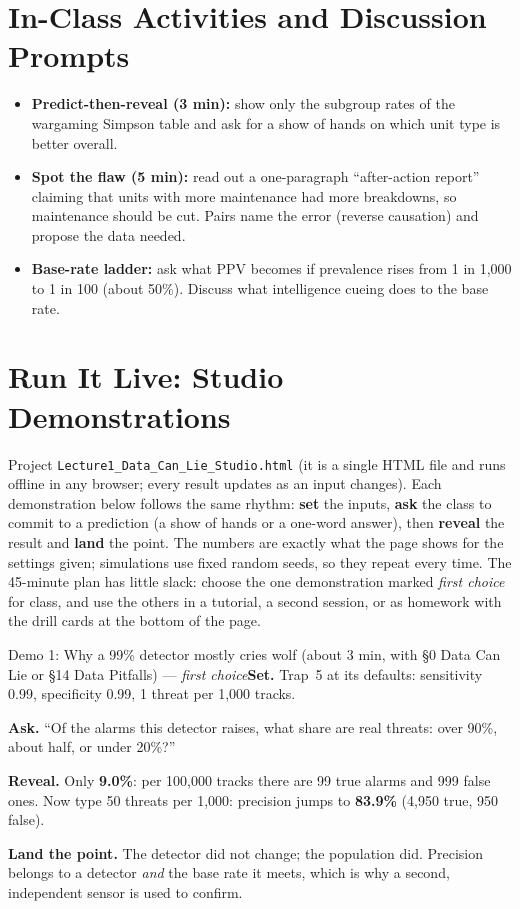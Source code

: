 \documentclass[11pt]{article}
\begin{document}
\section{In-Class Activities and Discussion Prompts}\label{sec:act}\begin{itemize}\item \textbf{Predict-then-reveal (3 min):} show only the subgroup rates of the wargaming Simpson table and ask for a show of hands on which unit type is better overall.\item \textbf{Spot the flaw (5 min):} read out a one-paragraph ``after-action report'' claiming that units with more maintenance had more breakdowns, so maintenance should be cut. Pairs name the error (reverse causation) and propose the data needed.\item \textbf{Base-rate ladder:} ask what PPV becomes if prevalence rises from 1 in 1,000 to 1 in 100 (about 50\%). Discuss what intelligence cueing does to the base rate.\end{itemize}

\section{Run It Live: Studio Demonstrations}\label{sec:live}

Project \texttt{Lecture1\_Data\_Can\_Lie\_Studio.html} (it is a single HTML file and runs offline in any browser; every result updates as an input changes). Each demonstration below follows the same rhythm: \textbf{set} the inputs, \textbf{ask} the class to commit to a prediction (a show of hands or a one-word answer), then \textbf{reveal} the result and \textbf{land} the point. The numbers are exactly what the page shows for the settings given; simulations use fixed random seeds, so they repeat every time. The 45-minute plan has little slack: choose the one demonstration marked \emph{first choice} for class, and use the others in a tutorial, a second session, or as homework with the drill cards at the bottom of the page.

\begin{live}{Demo 1: Why a 99\% detector mostly cries wolf (about 3 min, with \S0 Data Can Lie or \S14 Data Pitfalls) --- \emph{first choice}}\textbf{Set.} Trap~5 at its defaults: sensitivity 0.99, specificity 0.99, 1 threat per 1,000 tracks.\par\smallskip\textbf{Ask.} ``Of the alarms this detector raises, what share are real threats: over 90\%, about half, or under 20\%?''\par\smallskip\textbf{Reveal.} Only \textbf{9.0\%}: per 100,000 tracks there are 99 true alarms and 999 false ones. Now type 50 threats per 1,000: precision jumps to \textbf{83.9\%} (4,950 true, 950 false).\par\smallskip\textbf{Land the point.} The detector did not change; the population did. Precision belongs to a detector \emph{and} the base rate it meets, which is why a second, independent sensor is used to confirm.\end{live}
\end{document}
